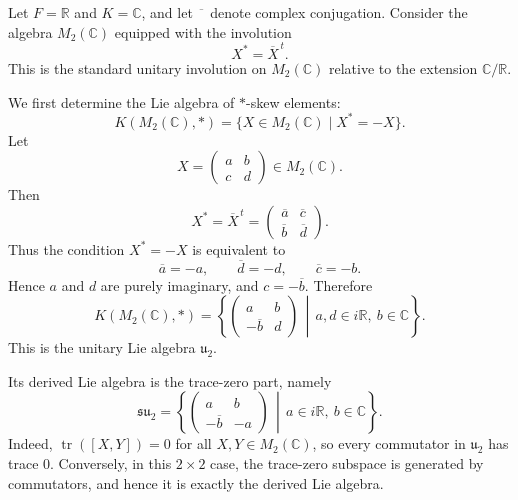 \documentclass[11pt, a4paper]{report}
\begin{document}
\begin{example}
    Let $F=\mathbb{R}$ and $K=\mathbb{C}$, and let $\overline{\phantom{x}}$ denote complex conjugation.
    Consider the algebra $M_{2}(\mathbb{C})$ equipped with the involution
    \[
    X^{*}=\overline{X}^{\,t}.
    \]
    This is the standard unitary involution on $M_{2}(\mathbb{C})$ relative to the extension
    $\mathbb{C}/\mathbb{R}$.
    
    We first determine the Lie algebra of $*$-skew elements:
    \[
    K(M_{2}(\mathbb{C}),*)=\{X\in M_{2}(\mathbb{C})\mid X^{*}=-X\}.
    \]
    Let
    \[
    X=\begin{pmatrix}a&b\\ c&d\end{pmatrix}\in M_{2}(\mathbb{C}).
    \]
    Then
    \[
    X^{*}
    =
    \overline{X}^{\,t}
    =
    \begin{pmatrix}
    \overline{a} & \overline{c}\\
    \overline{b} & \overline{d}
    \end{pmatrix}.
    \]
    Thus the condition $X^{*}=-X$ is equivalent to
    \[
    \overline{a}=-a,\qquad \overline{d}=-d,\qquad \overline{c}=-b.
    \]
    Hence $a$ and $d$ are purely imaginary, and $c=-\overline{b}$. Therefore
    \[
    K(M_{2}(\mathbb{C}),*)
    =
    \left\{
    \begin{pmatrix}
    a&b\\
    -\overline{b}&d
    \end{pmatrix}
    \,\middle|\,
    a,d\in i\mathbb{R},\ b\in\mathbb{C}
    \right\}.
    \]
    This is the unitary Lie algebra $\mathfrak{u}_{2}$.
    
    Its derived Lie algebra is the trace-zero part, namely
    \[
    \mathfrak{su}_{2}
    =
    \left\{
    \begin{pmatrix}
    a&b\\
    -\overline{b}&-a
    \end{pmatrix}
    \,\middle|\,
    a\in i\mathbb{R},\ b\in\mathbb{C}
    \right\}.
    \]
    Indeed, $\operatorname{tr}([X,Y])=0$ for all $X,Y\in M_{2}(\mathbb{C})$, so every commutator in
    $\mathfrak{u}_{2}$ has trace $0$. Conversely, in this $2\times2$ case, the trace-zero subspace is
    generated by commutators, and hence it is exactly the derived Lie algebra.
    

\end{example}
\end{document}
